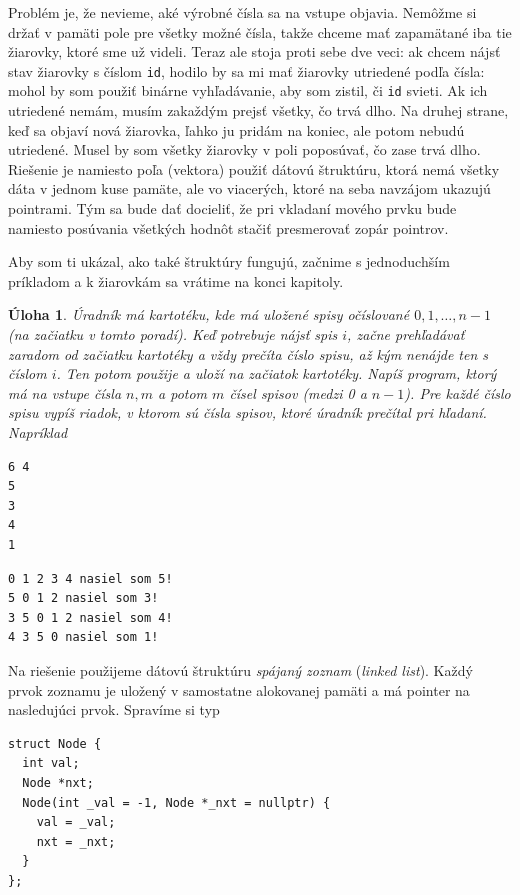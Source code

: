 \documentclass[10pt]{article}
\def\ods{\vspace*{10pt}}
\newtheorem{uloha}{Úloha}
\def\bp{\begin{minipage}[t]{0.45\textwidth}\vspace{0pt}}
\def\ep{\end{minipage}}
\begin{document}
{Problém je, že nevieme, aké výrobné čísla sa na vstupe objavia. Nemôžme si držať v pamäti 
pole pre všetky možné čísla, takže chceme mať zapamätané iba tie žiarovky, ktoré sme 
už videli. Teraz ale stoja proti sebe dve veci: ak chcem nájsť stav žiarovky s číslom 
{\tt id}, hodilo by sa mi mať žiarovky utriedené podľa čísla: mohol by som použiť
binárne vyhľadávanie, aby som zistil, či {\tt id} svieti. Ak ich utriedené nemám,
musím zakaždým prejsť všetky, čo trvá dlho. Na druhej strane, keď sa  objaví nová
žiarovka, ľahko ju pridám na koniec, ale potom nebudú utriedené. Musel by som 
všetky žiarovky v poli poposúvať, čo zase trvá dlho. 
Riešenie je namiesto poľa (vektora) použiť dátovú štruktúru, ktorá nemá všetky dáta
v jednom kuse pamäte, ale vo viacerých, ktoré na seba navzájom ukazujú pointrami. Tým
sa bude dať docieliť, že pri vkladaní mového prvku
bude namiesto posúvania všetkých hodnôt stačiť presmerovať
zopár pointrov. 

\ods Aby som ti ukázal, ako také štruktúry fungujú, začnime s jednoduchším príkladom
a k žiarovkám sa vrátime na konci kapitoly.

\begin{uloha}
  Úradník má kartotéku, kde má uložené spisy očíslované $0,1,\ldots,n-1$ (na začiatku
  v tomto poradí).
  Keď potrebuje nájsť spis $i$, začne prehľadávať zaradom od začiatku kartotéky
  a vždy prečíta číslo spisu, až kým nenájde ten s číslom $i$. Ten potom použije a 
  uloží na začiatok kartotéky. Napíš program, ktorý má na vstupe čísla $n, m$ a potom
  $m$ čísel spisov (medzi 0 a $n-1$). Pre každé číslo spisu vypíš riadok, v ktorom 
  sú čísla spisov, ktoré úradník prečítal pri hľadaní. Napríklad

  \ods
  \bp
  \begin{verbatim}
6 4
5
3
4
1
\end{verbatim}
\ep
\bp
\begin{verbatim}
0 1 2 3 4 nasiel som 5!
5 0 1 2 nasiel som 3!
3 5 0 1 2 nasiel som 4!
4 3 5 0 nasiel som 1!
\end{verbatim}
\ep
\end{uloha}

Na riešenie použijeme dátovú štruktúru {\em spájaný zoznam} ({\em linked list}).
Každý prvok zoznamu je uložený v samostatne alokovanej pamäti a má pointer
na nasledujúci prvok. Spravíme si typ

\begin{lstlisting}
struct Node {
  int val;
  Node *nxt;
  Node(int _val = -1, Node *_nxt = nullptr) {
    val = _val;
    nxt = _nxt;
  }
};
\end{lstlisting}

}
\end{document}

